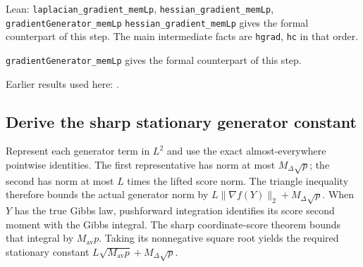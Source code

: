 \documentclass[11pt,a4paper]{report}
\begin{document}
\begin{leanbox}{Lean: \texttt{laplacian\_\allowbreak{}gradient\_\allowbreak{}memLp}, \texttt{hessian\_\allowbreak{}gradient\_\allowbreak{}memLp}, \texttt{gradientGenerator\_\allowbreak{}memLp}}
\texttt{hessian\_\allowbreak{}gradient\_\allowbreak{}mem\allowbreak{}Lp} gives the formal counterpart of this step. The main intermediate facts are \texttt{hgrad}, \texttt{hc} in that order.




\texttt{gradient\allowbreak{}Generator\_\allowbreak{}mem\allowbreak{}Lp} gives the formal counterpart of this step.
\end{leanbox}


Earlier results used here: \cite[Section~3.13.4]{LangevinLean2026ULASC}.
\subsection{\texorpdfstring{Derive the sharp stationary generator constant}{Derive the sharp stationary generator constant}}
\label{report-step-AverageLMC-LaplacianGenerator-lean-4}


Represent each generator term in \(L^{2}\) and use the exact almost-everywhere pointwise identities. The first representative has norm at most \(M_\Delta \sqrt p\); the second has norm at most \(L\) times the lifted score norm. The triangle inequality therefore bounds the actual generator norm by \(L\|\nabla f(Y)\|_{2}+M_\Delta \sqrt p\). When \(Y\) has the true Gibbs law, pushforward integration identifies its score second moment with the Gibbs integral. The sharp coordinate-score theorem bounds that integral by \(M_{\mathrm{av}}p\). Taking its nonnegative square root yields the required stationary constant \(L\sqrt{M_{\mathrm{av}}p}+M_\Delta\sqrt p\).
\end{document}
